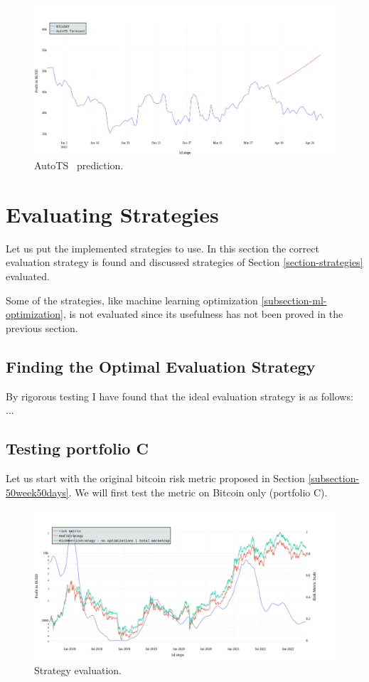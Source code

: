 \begin{figure}[!hbt]
    \centering
    \includegraphics[width=\columnwidth]{figures/autots-prediction.png}
    \caption{AutoTS~\cite{autots} prediction.}
    \label{figure-autots-prediction}
\end{figure}

\section{Evaluating Strategies}
Let us put the implemented strategies to use. In this section the correct evaluation strategy is found and discussed strategies of Section \ref{section-strategies} evaluated.

Some of the strategies, like machine learning optimization \ref{subsection-ml-optimization}, is not evaluated since its usefulness has not been proved in the previous section.

\subsection*{Finding the Optimal Evaluation Strategy}
By rigorous testing I have found that the ideal evaluation strategy is as follows: ...


\subsection*{Testing portfolio C}
Let us start with the original bitcoin risk metric proposed in Section \ref{subsection-50week50days}. We will first test the metric on Bitcoin only (portfolio C).

\begin{figure}[!hbt]
    \centering
    \includegraphics[width=\columnwidth]{figures/strat-eval1.png}
    \caption{Strategy evaluation.}
    \label{figure-strat-eval}
\end{figure}

